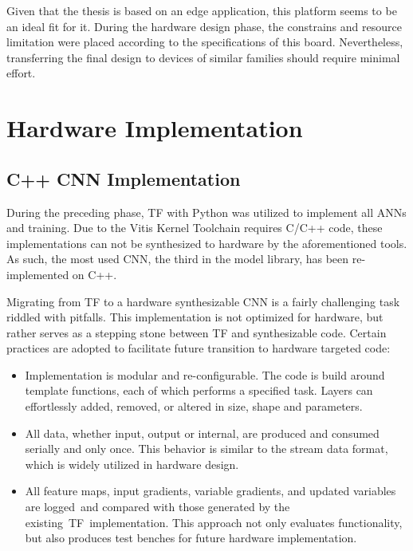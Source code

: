 Given that the thesis is based on an edge application, this platform seems to be an ideal fit for it. During the hardware design phase, the constrains and resource limitation were placed according to the specifications of this board. Nevertheless, transferring the final design to devices of similar families should require minimal effort.

\section{Hardware Implementation}

\subsection{C++ CNN Implementation}
During the preceding phase, TF with Python was utilized to implement all ANNs and training. Due to the Vitis Kernel Toolchain requires C/C++ code, these implementations can not be synthesized to hardware by the aforementioned tools. As such, the most used CNN, the third in the model library, has been re-implemented on C++.

Migrating from TF to a hardware synthesizable CNN is a fairly challenging task riddled with pitfalls. This implementation is not optimized for hardware, but rather serves as a stepping stone between TF and synthesizable code. Certain practices are adopted to facilitate future transition to hardware targeted code:

\begin{itemize}[leftmargin=*]
    \item Implementation is modular and re-configurable. The code is build around template functions, each of which performs a specified task. Layers can effortlessly added, removed, or altered in size, shape and parameters.
    \item All data, whether input, output or internal, are produced and consumed serially and only once. This behavior is similar to the stream data format, which is widely utilized in hardware design.
    \item All feature maps, input gradients, variable gradients, and updated variables are logged and compared with those generated by the existing TF implementation. This approach not only evaluates functionality, but also produces test benches for future hardware implementation.
\end{itemize}

